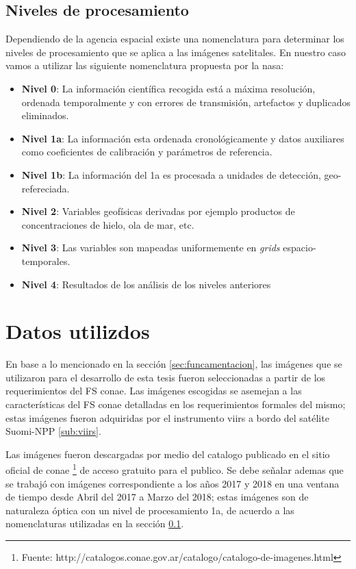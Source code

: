 \subsection{Niveles de procesamiento}\label{sub:nivelesdeprocesamiento}
Dependiendo de la agencia espacial existe una nomenclatura para determinar los niveles de procesamiento que se aplica a las imágenes satelitales. En nuestro caso vamos a utilizar las siguiente nomenclatura propuesta por la \ac{nasa}:
\begin{itemize}
	\item \textbf{Nivel 0}: La información científica recogida está a máxima resolución, ordenada temporalmente y con errores de transmisión, artefactos y duplicados eliminados.
 	\item \textbf{Nivel 1a}: La información esta ordenada cronológicamente y datos auxiliares como coeficientes de calibración y parámetros de referencia.
 	\item \textbf{Nivel 1b}: La información del 1a es procesada a unidades de detección, geo-refereciada.
 	\item \textbf{Nivel 2}: Variables geofísicas derivadas por ejemplo productos de concentraciones de hielo, ola de mar, etc.
 	\item \textbf{Nivel 3}: Las variables son mapeadas uniformemente en \textit{grids} espacio-temporales.
 	\item \textbf{Nivel 4}: Resultados de los análisis de los niveles anteriores
\end{itemize}


\section{Datos utilizdos}\label{sec:datosutilizados}

En base a lo mencionado en la sección \ref{sec:funcamentacion}, las imágenes que se utilizaron para el desarrollo de esta tesis fueron seleccionadas a partir de los requerimientos del \ac{FS} \ac{conae}. Las imágenes escogidas se asemejan a las características del \ac{FS} \ac{conae} detalladas en los requerimientos formales del mismo; estas imágenes fueron adquiridas por el instrumento \ac{viirs} a bordo del satélite Suomi-NPP \ref{sub:viirs}.

Las imágenes fueron descargadas por medio del catalogo  publicado en el sitio oficial de \ac{conae} \footnote{Fuente: http://catalogos.conae.gov.ar/catalogo/catalogo-de-imagenes.html} de acceso gratuito para el publico. Se debe señalar ademas que se trabajó con imágenes correspondiente a los años 2017 y 2018 en una ventana de tiempo desde Abril del 2017 a Marzo del 2018; estas imágenes son de naturaleza óptica con un nivel de procesamiento 1a, de acuerdo a las nomenclaturas utilizadas en la sección \ref{sub:nivelesdeprocesamiento}.

